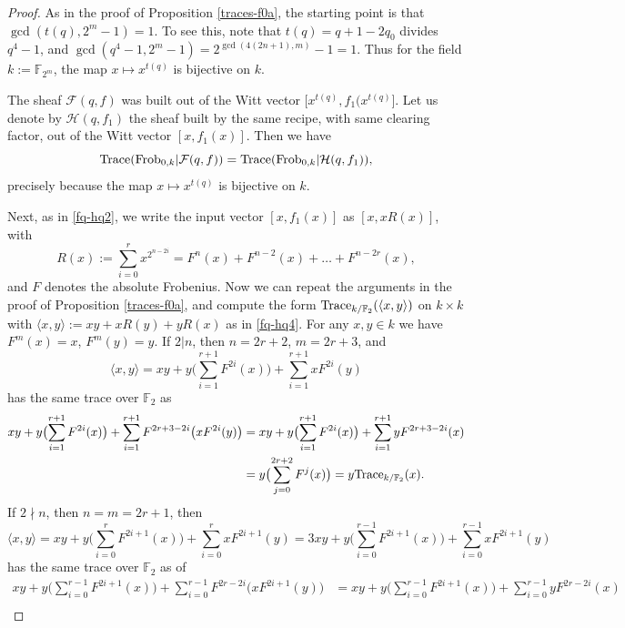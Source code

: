 \documentclass[11pt]{amsart}
\theoremstyle{plain}
\theoremstyle{definition}
\numberwithin{thm}{section}
\numberwithin{equation}{thm}
\newcommand{\Trace}{{\rm Trace}}
\newcommand{\sF}{{\mathcal F}}
\newcommand{\sH}{{\mathcal H}}
\newcommand{\F}{{\mathbb F}}
\newcommand{\0}{\emptyset}
\newcommand{\Frob}{\mathrm{Frob}}
\begin{document}
\begin{proof}
As in the proof of Proposition \ref{traces-f0a}, the starting point is that $\gcd(t(q),2^m-1)=1$. To see this, note that $t(q)=q+1-2q_0$ divides $q^4-1$, and $\gcd(q^4-1,2^m-1) =2^{\gcd(4(2n+1),m)}-1=1$. Thus for the field $k:=\F_{2^m}$, 
the map $x \mapsto x^{t(q)}$ is bijective on $k$. 

The sheaf $\sF(q,f)$ was built out of the Witt vector $\bigl[x^{t(q)},f_1(x^{t(q)}\bigr]$.
Let us denote by $\sH(q,f_1)$ the sheaf built by the same recipe, with same clearing factor, out of the Witt vector
$[x,f_1(x)]$. Then we have
$$\Trace(\Frob_{0,k} |\sF(q,f)) =\Trace(\Frob_{0,k}|\sH(q,f_1)),$$
precisely because the map $x \mapsto x^{t(q)}$ is bijective on $k$. 

Next, as in \eqref{fq-hq2}, we write the input vector $[x,f_1(x)]$ as $[x,xR(x)]$, with 
$$R(x):=\sum^r_{i=0}x^{2^{n-2i}} = F^n(x)+F^{n-2}(x)+ \ldots + F^{n-2r}(x),$$
and $F$ denotes the absolute Frobenius. Now we can repeat the arguments in the proof of Proposition \ref{traces-f0a}, and 
compute the form $\Trace_{k/\F_2}(\langle x,y \rangle)$ on $k \times k$ with $\langle x,y \rangle := xy+xR(y)+yR(x)$ as in \eqref{fq-hq4}.
For any $x,y \in k$ we have $F^m(x)=x$, $F^m(y)=y$. If $2|n$, then $n=2r+2$, $m=2r+3$, and  
$$\langle x,y \rangle =xy +y\bigl(\sum^{r+1}_{i=1}F^{2i}(x)\bigr) +\sum^{r+1}_{i=1}xF^{2i}(y)$$ 
has the same trace over $\F_2$ as 
$$\begin{aligned}xy +y\bigl(\sum^{r+1}_{i=1}F^{2i}(x)\bigr) + \sum^{r+1}_{i=1}F^{2r+3-2i}\bigl(xF^{2i}(y)\bigr) & = xy +y\bigl(\sum^{r+1}_{i=1}F^{2i}(x)\bigr) + \sum^{r+1}_{i=1}yF^{2r+3-2i}(x)\\
  & =y\bigl( \sum^{2r+2}_{j=0}F^j(x)\bigr)=y\Trace_{k/\F_2}(x).\end{aligned}$$
%
If $2 \nmid n$, then $n=m=2r+1$, then 
$$\langle x,y \rangle = xy +y\bigl(\sum^{r}_{i=0}F^{2i+1}(x)\bigr) +\sum^r_{i=0}xF^{2i+1}(y) = 
   3xy+ y\bigl(\sum^{r-1}_{i=0}F^{2i+1}(x)\bigr) +\sum^{r-1}_{i=0}xF^{2i+1}(y)$$ 
has the same trace over $\F_2$ as of
$$\begin{aligned}xy +y\bigl(\sum^{r-1}_{i=0}F^{2i+1}(x)\bigr) +\sum^{r-1}_{i=0}F^{2r-2i}\bigl(xF^{2i+1}(y) \bigr) & 
   =xy +y\bigl(\sum^{r-1}_{i=0}F^{2i+1}(x)\bigr) +\sum^{r-1}_{i=0}yF^{2r-2i}(x)\\

\end{aligned}$$
\end{proof}
\end{document}
